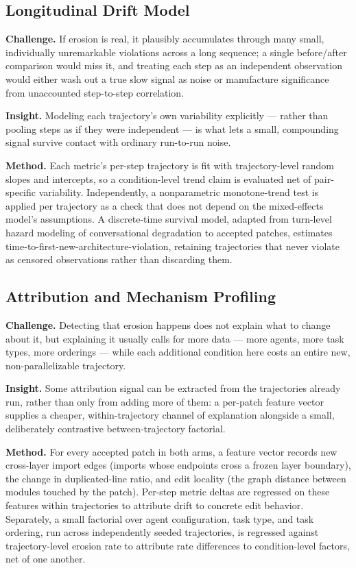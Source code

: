 \documentclass[11pt]{article}
\begin{document}
\subsection{Longitudinal Drift Model}
\textbf{Challenge.} If erosion is real, it plausibly accumulates through many small, individually unremarkable violations across a long sequence; a single before/after comparison would miss it, and treating each step as an independent observation would either wash out a true slow signal as noise or manufacture significance from unaccounted step-to-step correlation.

\textbf{Insight.} Modeling each trajectory's own variability explicitly --- rather than pooling steps as if they were independent --- is what lets a small, compounding signal survive contact with ordinary run-to-run noise.

\textbf{Method.} Each metric's per-step trajectory is fit with trajectory-level random slopes and intercepts, so a condition-level trend claim is evaluated net of pair-specific variability. Independently, a nonparametric monotone-trend test is applied per trajectory as a check that does not depend on the mixed-effects model's assumptions. A discrete-time survival model, adapted from turn-level hazard modeling of conversational degradation to accepted patches, estimates time-to-first-new-architecture-violation, retaining trajectories that never violate as censored observations rather than discarding them.

\subsection{Attribution and Mechanism Profiling}
\textbf{Challenge.} Detecting that erosion happens does not explain what to change about it, but explaining it usually calls for more data --- more agents, more task types, more orderings --- while each additional condition here costs an entire new, non-parallelizable trajectory.

\textbf{Insight.} Some attribution signal can be extracted from the trajectories already run, rather than only from adding more of them: a per-patch feature vector supplies a cheaper, within-trajectory channel of explanation alongside a small, deliberately contrastive between-trajectory factorial.

\textbf{Method.} For every accepted patch in both arms, a feature vector records new cross-layer import edges (imports whose endpoints cross a frozen layer boundary), the change in duplicated-line ratio, and edit locality (the graph distance between modules touched by the patch). Per-step metric deltas are regressed on these features within trajectories to attribute drift to concrete edit behavior. Separately, a small factorial over agent configuration, task type, and task ordering, run across independently seeded trajectories, is regressed against trajectory-level erosion rate to attribute rate differences to condition-level factors, net of one another.
\end{document}
